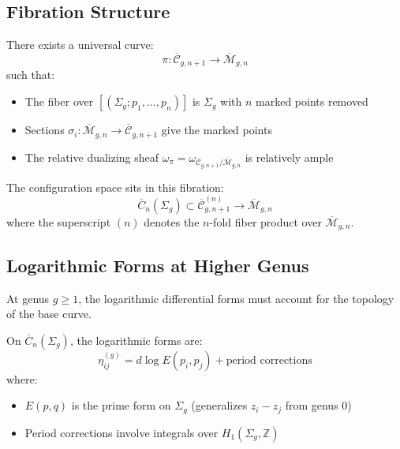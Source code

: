 \subsection{Fibration Structure}

\begin{theorem}
\label{thm:universal-curve-fibration}
There exists a universal curve:
\begin{equation}
\pi: \overline{\mathcal{C}}_{g,n+1} \to \overline{\mathcal{M}}_{g,n}
\end{equation}
such that:
\begin{itemize}
\item The fiber over $[(\Sigma_g; p_1, \ldots, p_n)]$ is $\Sigma_g$ with $n$ marked points removed
\item Sections $\sigma_i: \overline{\mathcal{M}}_{g,n} \to \overline{\mathcal{C}}_{g,n+1}$ give the marked points
\item The relative dualizing sheaf $\omega_\pi = \omega_{\overline{\mathcal{C}}_{g,n+1}/\overline{\mathcal{M}}_{g,n}}$ is relatively ample
\end{itemize}

The configuration space sits in this fibration:
\begin{equation}
\overline{C}_n(\Sigma_g) \subset \overline{\mathcal{C}}_{g,n+1}^{(n)} \to \overline{\mathcal{M}}_{g,n}
\end{equation}
where the superscript $(n)$ denotes the $n$-fold fiber product over $\overline{\mathcal{M}}_{g,n}$.
\end{theorem}

\subsection{Logarithmic Forms at Higher Genus}

At genus $g \geq 1$, the logarithmic differential forms must account for the topology of the base curve.

\begin{definition}
\label{def:higher-genus-log-forms}
On $\overline{C}_n(\Sigma_g)$, the logarithmic forms are:
\begin{equation}
\eta_{ij}^{(g)} = d \log E(p_i, p_j) + \text{period corrections}
\end{equation}
where:
\begin{itemize}
\item $E(p, q)$ is the prime form on $\Sigma_g$ (generalizes $z_i - z_j$ from genus 0)
\item Period corrections involve integrals over $H_1(\Sigma_g, \mathbb{Z})$
\end{itemize}
\end{definition}

